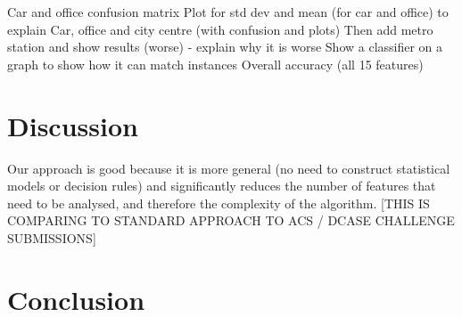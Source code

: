 \documentclass[11pt]{article}
\begin{document}
\begin{multicols}{2}
Car and office confusion matrix
Plot for std dev and mean (for car and office) to explain
Car, office and city centre (with confusion and plots)
Then add metro station and show results (worse) - explain why it is worse
Show a classifier on a graph to show how it can match instances
Overall accuracy (all 15 features)


\section{Discussion}


Our approach is good because it is more general (no need to construct statistical models or decision rules) and significantly reduces the number of features that need to be analysed, and therefore the complexity of the algorithm. [THIS IS COMPARING TO STANDARD APPROACH TO ACS / DCASE CHALLENGE SUBMISSIONS]






\section{Conclusion}











\end{multicols}
\end{document}
